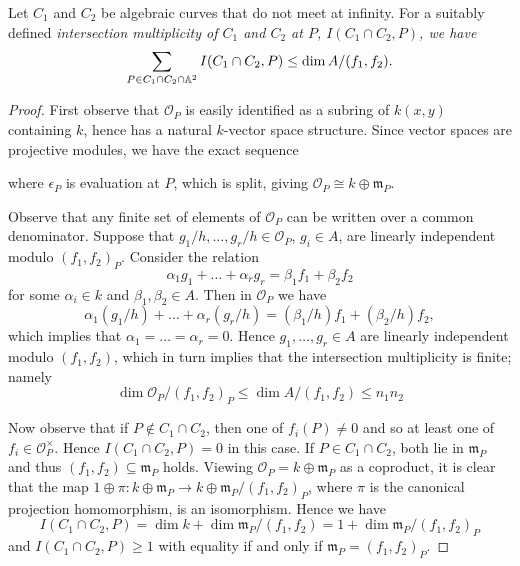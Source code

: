 \documentclass[10pt]{amsart}
\begin{document}
\begin{prop}\label{prop3}
  Let $C_1$ and $C_2$ be algebraic curves that do not meet at infinity.
  For a suitably defined \it{intersection multiplicity} of $C_1$ and $C_2$ at $P$, $I(C_1 \cap C_2, P)$, we have
  $$\sum_{P \in C_1 \cap C_2 \cap \mathbb{A}^2} I(C_1 \cap C_2, P) \leq \dim A / (f_1, f_2).$$

  \begin{proof}
    First observe that $\mathcal{O}_P$ is easily identified as a subring of $k(x,y)$ containing $k$, hence has a natural $k$-vector space structure.
    Since vector spaces are projective modules, we have the exact sequence
    \begin{center}
    \end{center}
    where $\epsilon_P$ is evaluation at $P$, which is split, giving $\mathcal{O}_P \cong k \oplus \mathfrak{m}_P$.
    
    Observe that any finite set of elements of $\mathcal{O}_P$ can be written over a common denominator.
    Suppose that $g_1/h, \ldots, g_r/h \in \mathcal{O}_P$, $g_i \in A$, are linearly independent modulo $(f_1, f_2)_P$.
    Consider the relation
    $$\alpha_1g_1 + \ldots + \alpha_rg_r = \beta_1 f_1 + \beta_2 f_2$$
    for some $\alpha_i \in k$ and $\beta_1, \beta_2 \in A.$
    Then in $\mathcal{O}_P$ we have
    $$\alpha_1(g_1/h) + \ldots + \alpha_r(g_r/h) = (\beta_1/h)f_1 + (\beta_2/h) f_2,$$
    which implies that $\alpha_1 = \ldots = \alpha_r = 0$.
    Hence $g_1, \ldots, g_r \in A$ are linearly independent modulo $(f_1, f_2)$, which in turn implies that the intersection multiplicity is finite; namely
    $$\dim \mathcal{O}_P/(f_1, f_2)_P \leq \dim A/(f_1, f_2) \leq n_1n_2$$
    

    Now observe that if $P \not \in C_1 \cap C_2$, then one of $f_i(P) \neq 0$ and so at least one of $f_i \in \mathcal{O}_P^\times$.
    Hence $I(C_1 \cap C_2, P) = 0$ in this case.
    If $P \in C_1 \cap C_2$, both lie in $\mathfrak{m}_P$ and thus $(f_1, f_2) \subseteq \mathfrak{m}_P$ holds.
    Viewing $\mathcal{O}_P = k \oplus \mathfrak{m}_P$ as a coproduct, it is clear that the map $1 \oplus \pi \colon k \oplus \mathfrak{m}_P \rightarrow k \oplus \mathfrak{m}_P/(f_1,f_2)_P$, where $\pi$ is the canonical projection homomorphism, is an isomorphism.
    Hence we have
    $$I(C_1 \cap C_2, P) = \dim{k} + \dim{\mathfrak{m}_P/(f_1, f_2)} = 1 + \dim{\mathfrak{m}_P/(f_1, f_2)_P}$$
    and $I(C_1 \cap C_2, P) \geq 1$ with equality if and only if $\mathfrak{m}_P = (f_1, f_2)_P$.
    

\end{proof}
\end{prop}
\end{document}
